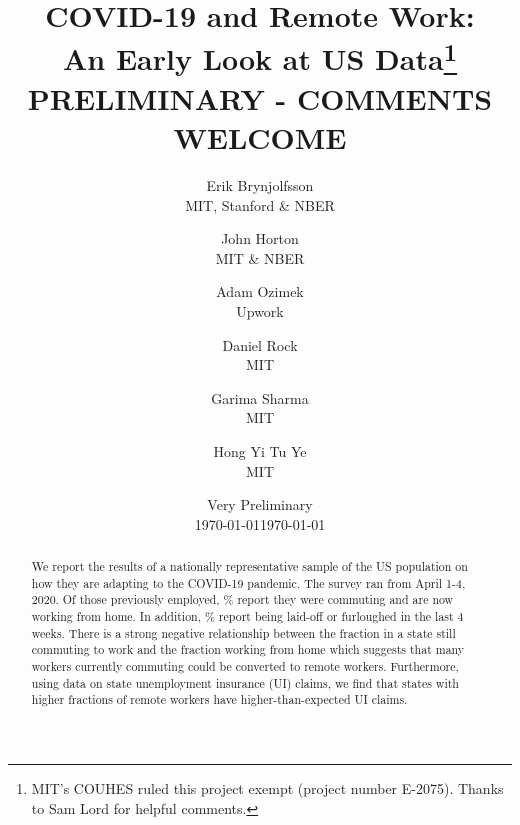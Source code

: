 \documentclass[12pt]{article}
\newcommand{\covid}{COVID-19}
\begin{document}
 



\title{COVID-19 and Remote Work:\\ An Early Look at US Data\footnote{
    MIT's COUHES ruled this project exempt (project number E-2075).
    Thanks to Sam Lord for helpful comments. 
  } \\  {\color{red} PRELIMINARY - COMMENTS WELCOME}}

\date{Very Preliminary \\ \today}

\date{\today}

\author{Erik Brynjolfsson\\MIT, Stanford \& NBER \and John Horton\\MIT \& NBER \and Adam Ozimek\\Upwork \and Daniel Rock\\MIT \and Garima Sharma\\MIT \and Hong Yi Tu Ye\\MIT}


\maketitle

\begin{abstract}
  \noindent 
  We report the results of a nationally representative sample of the US population on how they are adapting to the \covid{} pandemic.
  The survey ran from April 1-4, 2020.
  Of those previously employed, \WFH{}\% report they were commuting and are now working from home.
  In addition, \LaidOff{}\% report being laid-off or furloughed in the last 4 weeks.   
  There is a strong negative relationship between the fraction in a state still commuting to work and the fraction working from home which suggests that many workers currently commuting could be converted to remote workers. Furthermore, using data on state unemployment insurance (UI) claims, we find that states with higher fractions of remote workers have higher-than-expected UI claims.
  \newline 
\end{abstract} 


\onehalfspacing 
\end{document}
